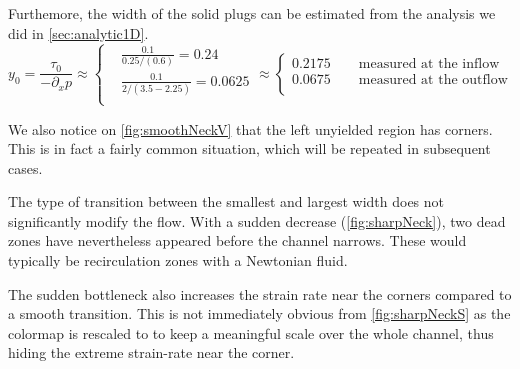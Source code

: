 \documentclass[11 pt]{report}
\begin{document}
Furthemore, the width of the solid plugs can be estimated from the analysis we did in \cref{sec:analytic1D}. 
\begin{equation}
    y_0 = \frac{\tau_0}{-\partial_x p} \approx 
    \begin{cases}
        &\frac{0.1}{0.25 / (0.6)} = 0.24\\
        &\frac{0.1}{2 /(3.5-2.25)} = 0.0625\\
    \end{cases}
    \approx
    \begin{cases}
        0.2175 \qquad \text{measured at the inflow}\\
        0.0675  \qquad \text{measured at the outflow}\\
    \end{cases}    
\end{equation}

We also notice on \cref{fig:smoothNeckV} that the left unyielded region has corners. This is in fact a fairly common situation, which will be repeated in subsequent cases.

The type of transition between the smallest and largest width does not significantly modify the flow. With a sudden decrease (\cref{fig:sharpNeck}), two dead zones have nevertheless appeared before the channel narrows. These would typically be recirculation zones with a Newtonian fluid. 

The sudden bottleneck also increases the strain rate near the corners compared to a smooth transition. This is not immediately obvious from \cref{fig:sharpNeckS} as the colormap is rescaled to to keep a meaningful scale over the whole channel, thus hiding the extreme strain-rate near the corner.
\end{document}
